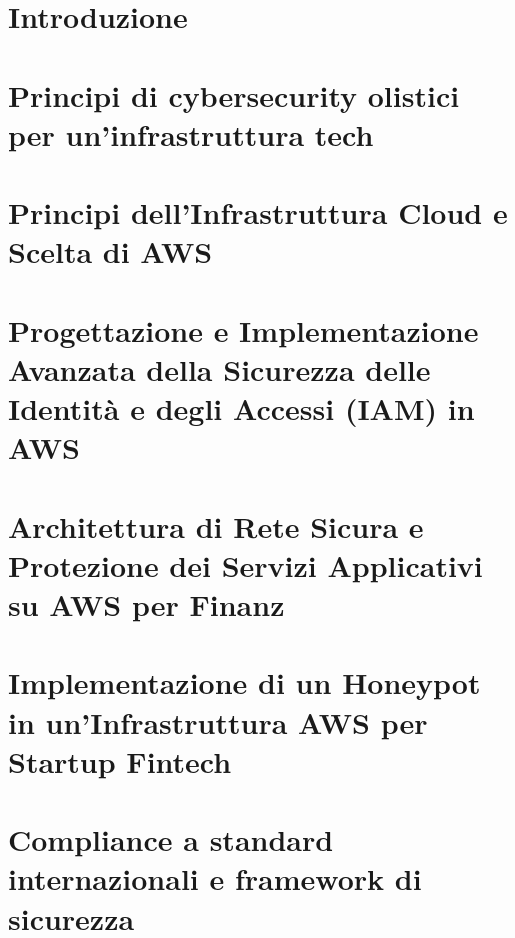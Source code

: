 \documentclass[a4paper,12pt]{report}
\begin{document}
\setcounter{tocdepth}{2} %
\tableofcontents
\listoffigures %

\chapter{Introduzione}
\label{chapter:introduzione}


\chapter{Principi di cybersecurity olistici per un'infrastruttura tech}
\label{ch:principi-cybersecurity}


\chapter{Principi dell'Infrastruttura Cloud e Scelta di AWS}
\label{ch:cloud-aws}


\chapter{Progettazione e Implementazione Avanzata della Sicurezza delle Identità e degli Accessi (IAM) in AWS}
\label{ch:iam_security}

\chapter{Architettura di Rete Sicura e Protezione dei Servizi Applicativi su AWS per Finanz}
\label{ch:vpc_infra_security}


\chapter{Implementazione di un Honeypot in un'Infrastruttura AWS per Startup Fintech}
\label{chap:honeypot_aws}


\chapter{Compliance a standard internazionali e framework di sicurezza} 
\label{ch:compliance}

\end{document}

